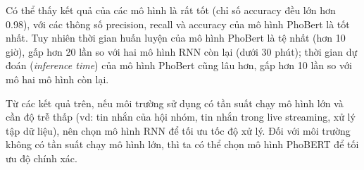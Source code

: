 Có thể thấy kết quả của các mô hình là rất tốt (chỉ số accuracy đều lớn hơn 0.98), với các thông số precision, recall và accuracy của mô hình PhoBert là tốt nhất. Tuy nhiên thời gian huấn luyện của mô hình PhoBert là tệ nhất (hơn 10 giờ), gấp hơn 20 lần so với hai mô hình RNN còn lại (dưới 30 phút); thời gian dự đoán (\textit{inference time}) của mô hình PhoBert cũng lâu hơn, gấp hơn 10 lần so với mô hai mô hình còn lại.

Từ các kết quả trên, nếu môi trường sử dụng có tần suất chạy mô hình lớn và cần độ trễ thấp (vd: tin nhắn của hội nhóm, tin nhắn trong live streaming, xử lý tập dữ liệu), nên chọn mô hình RNN để tối ưu tốc độ xử lý. Đối với môi trường không có tần suất chạy mô hình lớn, thì ta có thể chọn mô hình PhoBERT để tối ưu độ chính xác.